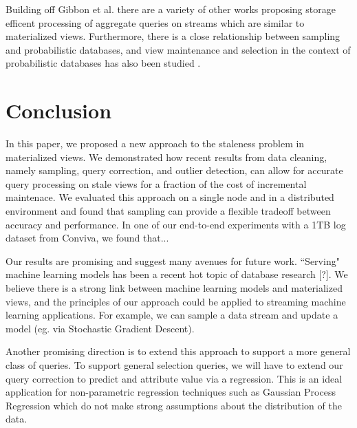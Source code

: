 Building off Gibbon et al. there are a variety of other works proposing storage efficent processing of aggregate queries on streams \cite{dobra2002processing, greenwald2001space} which are similar to materialized views. Furthermore, there is a close relationship between sampling and probabilistic databases, and view maintenance and selection in the context of probabilistic databases has also been studied \cite{re2007materialized}.

\section{Conclusion}
In this paper, we proposed a new approach to the staleness problem in materialized views.
We demonstrated how recent results from data cleaning, namely sampling, query correction, and outlier detection, can
allow for accurate query processing on stale views for a fraction of the cost of incremental maintenace.
We evaluated this approach on a single node and in a distributed environment and found that sampling can provide a flexible tradeoff 
between accuracy and performance.
In one of our end-to-end experiments with a 1TB log dataset from Conviva, we found that...

Our results are promising and suggest many avenues for future work.
``Serving" machine learning models has been a recent hot topic of database research [?].
We believe there is a strong link between machine learning models and materialized views, and the principles of our approach could be applied
to streaming machine learning applications.
For example, we can sample a data stream and update a model (eg. via Stochastic Gradient Descent).

Another promising direction is to extend this approach to support a more general class of queries.
To support general selection queries, we will have to extend our query correction to predict and attribute value via a regression.
This is an ideal application for non-parametric regression techniques such as Gaussian Process Regression which do
not make strong assumptions about the distribution of the data.


